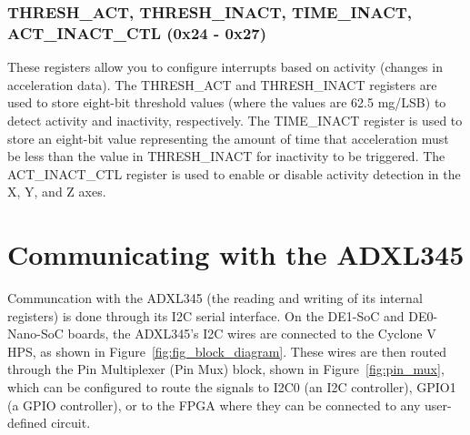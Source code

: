 \documentclass[11pt, twoside, pdftex]{article}
\begin{document}
\subsubsection{THRESH\_ACT, THRESH\_INACT, TIME\_INACT, ACT\_INACT\_CTL (0x24 - 0x27)}

These registers allow you to configure interrupts based on activity (changes in acceleration data). The THRESH\_ACT and THRESH\_INACT registers are used to store eight-bit threshold values (where the values are 62.5 mg/LSB) to detect activity and inactivity, respectively. The TIME\_INACT register is used to store an eight-bit value representing the amount of time that acceleration must be less than the value in THRESH\_INACT for inactivity to be triggered. The ACT\_INACT\_CTL register is used to enable or disable activity detection in the X, Y, and Z axes.

\pagebreak

\section{Communicating with the ADXL345}


Communcation with the ADXL345 (the reading and writing of its internal registers) is done through its I2C serial interface. On the DE1-SoC and DE0-Nano-SoC boards, the ADXL345's I2C wires are connected to the Cyclone V HPS, as shown in Figure~\ref{fig:fig_block_diagram}. These wires are then routed through the Pin Multiplexer (Pin Mux) block, shown in Figure~\ref{fig:pin_mux}, which can be configured to route the signals to I2C0 (an I2C controller), GPIO1 (a GPIO controller), or to the FPGA where they can be connected to any user-defined circuit.
\end{document}
